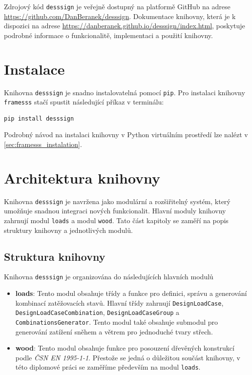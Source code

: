 Zdrojový kód \texttt{desssign} je veřejně dostupný na platformě GitHub na adrese \url{https://github.com/DanBeranek/desssign}. Dokumentace knihovny, která je k dispozici na adrese \url{https://danberanek.github.io/desssign/index.html}, poskytuje podrobné informace o funkcionalitě, implementaci a použití knihovny.

\section{Instalace}
Knihovna \texttt{desssign} je snadno instalovatelná pomocí \texttt{pip}. Pro instalaci knihovny \texttt{framesss} stačí spustit následující příkaz v terminálu:

\begin{verbatim}
pip install desssign
\end{verbatim}

Podrobný návod na instalaci knihovny v Python virtuálním prostředí lze nalézt v \autoref{sec:framesss_instalation}.

\section{Architektura knihovny}
Knihovna \texttt{desssign} je navržena jako modulární a rozšiřitelný systém, který umožňuje snadnou integraci nových funkcionalit. Hlavní moduly knihovny zahrnují modul \texttt{loads} a modul \texttt{wood}. Tato část kapitoly se zaměří na popis struktury knihovny a jednotlivých modulů.

\subsection{Struktura knihovny}
Knihovna \texttt{desssign} je organizována do následujících hlavních modulů
\begin{itemize}
    \item \textbf{loads}: Tento modul obsahuje třídy a funkce pro definici, správu a generování kombinací zatěžovacích stavů. Hlavní třídy zahrnují \texttt{DesignLoadCase}, \texttt{DesignLoadCaseCombination}, \texttt{DesignLoadCaseGroup} a \texttt{CombinationsGenerator}. Tento modul také obsahuje submodul pro generování zatížení sněhem a větrem pro jednoduché tvary střech.
    \item \textbf{wood}: Tento modul obsahuje funkce pro posouzení dřevěných konstrukcí podle \textit{ČSN EN 1995-1-1}. Přestože se jedná o důležitou součást knihovny, v této diplomové práci se zaměříme především na modul \texttt{loads}.
\end{itemize}

